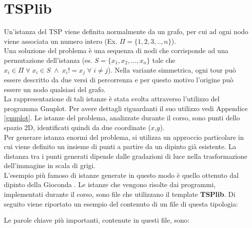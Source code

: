 \chapter{TSPlib}\label{TSPlib}
Un'istanza del TSP viene definita normalmente da un grafo, per cui ad ogni nodo viene associata un numero intero (Ex. $\Pi = \{1,2,3,..,n\}$). \\
Una soluzione del problema è una sequenza di nodi che corrisponde ad una permutazione dell'istanza (es. $S = \{x_1,x_2,...,x_n\}$ tale che $x_i \in \Pi\;\forall\;x_i\in S\;\wedge\; x_i!=x_j\;\forall\;i\neq j$). Nella variante simmetrica, ogni tour può essere descritto da due versi di percorrenza e per questo motivo l'origine può essere un nodo qualsiasi del grafo.\\
La rappresentazione di tali istanze è stata svolta attraverso l'utilizzo del programma Gnuplot. Per avere dettagli riguardanti il suo utilizzo vedi Appendice \ref{gnuplot}. Le istanze del problema, analizzate durante il corso, sono punti dello spazio 2D, identificati quindi da due coordinate ($x$,$y$).\\
Per generare istanza enormi del problema, si utilizza un approccio particolare in cui viene definito un insieme di punti a partire da un dipinto già esistente. La distanza tra i punti generati dipende dalle gradazioni di luce nella trasformazione dell'immagine in scala di grigi.\\
L'esempio più famoso di istanze generate in questo modo è quello ottenuto dal dipinto della Gioconda \cite{monnalisa}.
Le istanze che vengono risolte dai programmi, implementati durante il corso, sono file che utilizzano il template \textbf{TSPlib}. Di seguito viene riportato un esempio del contenuto di un file di questa tipologia: 

Le parole chiave più importanti, contenute in questi file, sono:\\
